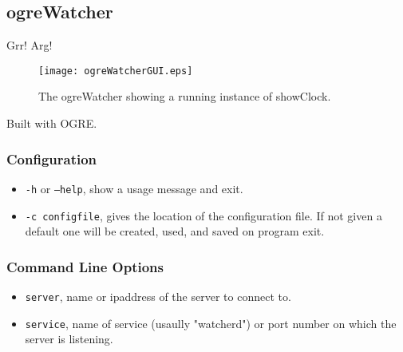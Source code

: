 
\subsection{ogreWatcher}

Grr! Arg!

\begin{figure}
\centering
\texttt{[image: ogreWatcherGUI.eps]}
\caption{The ogreWatcher showing a running instance of showClock.}
\label{ogreWatcher}
\end{figure}

Built with OGRE.

\subsubsection{Configuration}

\begin{itemize}
\item {\tt -h} or {\tt --help}, show a usage message and exit. 
\item {\tt -c configfile}, gives the location of the configuration file. If not given a default one will be created, used, and saved on program exit.
\end{itemize}

\subsubsection{Command Line Options}

\begin{itemize}
\item {\tt server}, name or ipaddress of the server to connect to.
\item {\tt service}, name of service (usaully "watcherd") or port number on which the server is listening.
\end{itemize}

